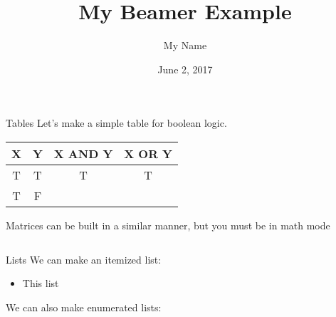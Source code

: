\documentclass{beamer}
\title{My Beamer Example}
\author{My Name}
\institute{My Home Institution}
\date{June 2, 2017}
\begin{document}
	\begin{frame}
		\maketitle
	\end{frame}
	
	\begin{frame}{Tables}
		Let's make a simple table for boolean logic.
		\begin{center}
			\begin{tabular}{c|c||c|c}
				X & Y & X AND Y & X OR Y \\
				\hline
				T & T &    T    &    T   \\
				T & F     %
			\end{tabular}
		\end{center}
		
		Matrices can be built in a similar manner, but you must be in math mode
		\begin{center}
			$
			$
		\end{center}	
	\end{frame}	
	
	\begin{frame}{Lists}	
		We can make an itemized list:
		\begin{itemize}
			\item This list
                \end{itemize}

		We can also make enumerated lists:
	        

        \end{frame}
	
\end{document}
